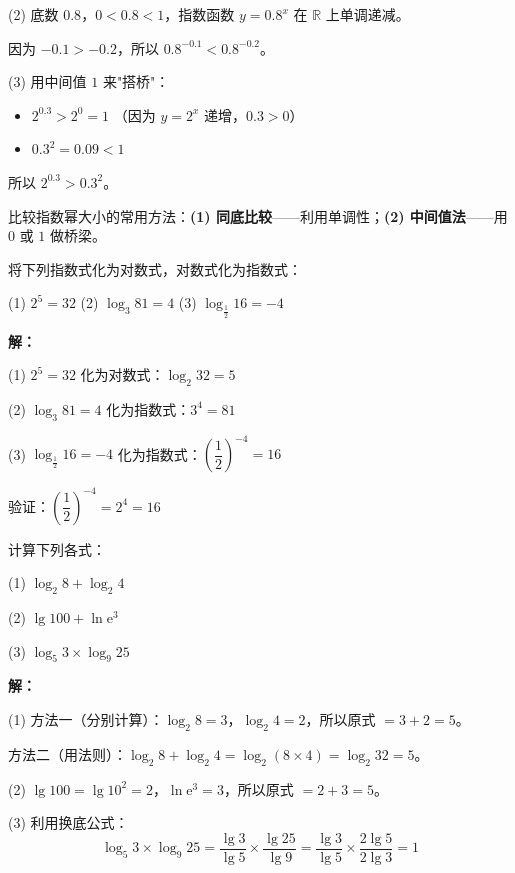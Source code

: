 \documentclass[12pt, a4paper]{ctexart}
\begin{document}
(2) 底数 $0.8$，$0<0.8<1$，指数函数 $y=0.8^x$ 在 $\mathbb{R}$ 上单调递减。

因为 $-0.1 > -0.2$，所以 $0.8^{-0.1} < 0.8^{-0.2}$。

(3) 用中间值 $1$ 来"搭桥"：
\begin{itemize}[leftmargin=2em]
  \item $2^{0.3} > 2^0 = 1$ \quad（因为 $y=2^x$ 递增，$0.3>0$）
  \item $0.3^{2} = 0.09 < 1$
\end{itemize}
所以 $2^{0.3} > 0.3^{2}$。

\begin{tipbox}[方法总结]
比较指数幂大小的常用方法：\textbf{(1) 同底比较}——利用单调性；\textbf{(2) 中间值法}——用 $0$ 或 $1$ 做桥梁。
\end{tipbox}

\begin{examplebox}[【例4】指数式与对数式的互化]
将下列指数式化为对数式，对数式化为指数式：
\par (1) $2^5 = 32$ \qquad (2) $\log_3 81 = 4$ \qquad (3) $\log_{\frac{1}{2}} 16 = -4$
\end{examplebox}

\textbf{解：}

(1) $2^5 = 32$ 化为对数式：$\log_2 32 = 5$

(2) $\log_3 81 = 4$ 化为指数式：$3^4 = 81$

(3) $\log_{\frac{1}{2}} 16 = -4$ 化为指数式：$\left(\dfrac{1}{2}\right)^{-4} = 16$

验证：$\left(\dfrac{1}{2}\right)^{-4} = 2^4 = 16$ \checkmark

\begin{examplebox}[【例5】对数的运算]
计算下列各式：
\par (1) $\log_2 8 + \log_2 4$
\par (2) $\lg 100 + \ln \mathrm{e}^3$
\par (3) $\log_5 3 \times \log_9 25$
\end{examplebox}

\textbf{解：}

(1) 方法一（分别计算）：$\log_2 8 = 3$，$\log_2 4 = 2$，所以原式 $= 3+2=5$。

方法二（用法则）：$\log_2 8 + \log_2 4 = \log_2(8\times 4) = \log_2 32 = 5$。

(2) $\lg 100 = \lg 10^2 = 2$，$\ln \mathrm{e}^3 = 3$，所以原式 $= 2+3 = 5$。

(3) 利用换底公式：
\[
\log_5 3 \times \log_9 25 = \frac{\lg 3}{\lg 5} \times \frac{\lg 25}{\lg 9} = \frac{\lg 3}{\lg 5} \times \frac{2\lg 5}{2\lg 3} = 1
\]
\end{document}
